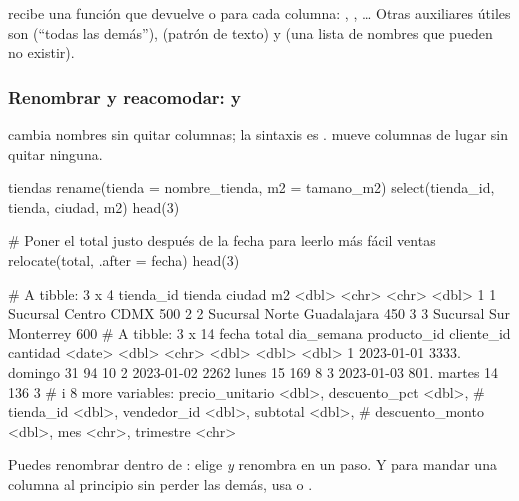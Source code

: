 {\sloppy {} recibe una función que devuelve  o
 para cada columna: , ,
\ldots{} Otras auxiliares útiles son
 (``todas las demás''),  (patrón de
texto) y  (una lista de nombres que pueden no existir).\par}

\subsubsection{Renombrar y reacomodar: \texorpdfstring{}{rename()} y \texorpdfstring{}{relocate()}}

 cambia nombres sin quitar columnas; la sintaxis es
.  mueve columnas de lugar sin
quitar ninguna.

\begin{rcode}
tiendas %
  rename(tienda = nombre_tienda, m2 = tamano_m2) %
  select(tienda_id, tienda, ciudad, m2) %
  head(3)

# Poner el total justo después de la fecha para leerlo más fácil
ventas %
  relocate(total, .after = fecha) %
  head(3)
\end{rcode}
\begin{rsalida}
# A tibble: 3 x 4
  tienda_id tienda          ciudad         m2
      <dbl> <chr>           <chr>       <dbl>
1         1 Sucursal Centro CDMX          500
2         2 Sucursal Norte  Guadalajara   450
3         3 Sucursal Sur    Monterrey     600
# A tibble: 3 x 14
  fecha      total dia_semana producto_id cliente_id cantidad
  <date>     <dbl> <chr>            <dbl>      <dbl>    <dbl>
1 2023-01-01 3333. domingo             31         94       10
2 2023-01-02 2262  lunes               15        169        8
3 2023-01-03  801. martes              14        136        3
# i 8 more variables: precio_unitario <dbl>, descuento_pct <dbl>,
#   tienda_id <dbl>, vendedor_id <dbl>, subtotal <dbl>,
#   descuento_monto <dbl>, mes <chr>, trimestre <chr>
\end{rsalida}

\begin{consejo}
Puedes renombrar dentro de :
 elige \emph{y} renombra en
un paso. Y para mandar una columna al principio sin perder las demás, usa
 o .
\end{consejo}

